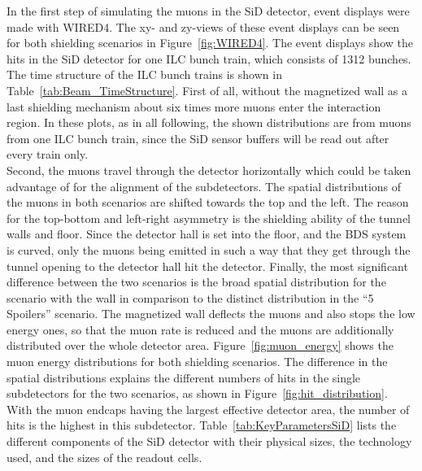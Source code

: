 In the first step of simulating the muons in the SiD detector, event displays were made with WIRED4\cite{Wired4}.
The xy- and zy-views of these event displays can be seen for both shielding scenarios in Figure~\ref{fig:WIRED4}.
The event displays show the hits in the SiD detector for one ILC bunch train, which consists of 1312 bunches.
The time structure of the ILC bunch trains is shown in Table~\ref{tab:Beam_TimeStructure}.
First of all, without the magnetized wall as a last shielding mechanism about six times more muons enter the interaction region.
In these plots, as in all following, the shown distributions are from muons from one ILC bunch train, since the SiD sensor buffers will be read out after every train only.\\
Second, the muons travel through the detector horizontally which could be taken advantage of for the alignment of the subdetectors.
The spatial distributions of the muons in both scenarios are shifted towards the top and the left.
The reason for the top-bottom and left-right asymmetry is the shielding ability of the tunnel walls and floor.
Since the detector hall is set into the floor, and the BDS system is curved, only the muons being emitted in such a way that they get through the tunnel opening to the detector hall hit the detector.
Finally, the most significant difference between the two scenarios is the broad spatial distribution for the scenario with the wall in comparison to the distinct distribution in the ``5 Spoilers'' scenario.
The magnetized wall deflects the muons and also stops the low energy ones, so that the muon rate is reduced and the muons are additionally distributed over the whole detector area.
Figure~\ref{fig:muon_energy} shows the muon energy distributions for both shielding scenarios.
The difference in the spatial distributions explains the different numbers of hits in the single subdetectors for the two scenarios, as shown in Figure~\ref{fig:hit_distribution}.
With the muon endcaps having the largest effective detector area, the number of hits is the highest in this subdetector.
Table~\ref{tab:KeyParametersSiD} lists the different components of the SiD detector with their physical sizes, the technology used, and the sizes of the readout cells.

